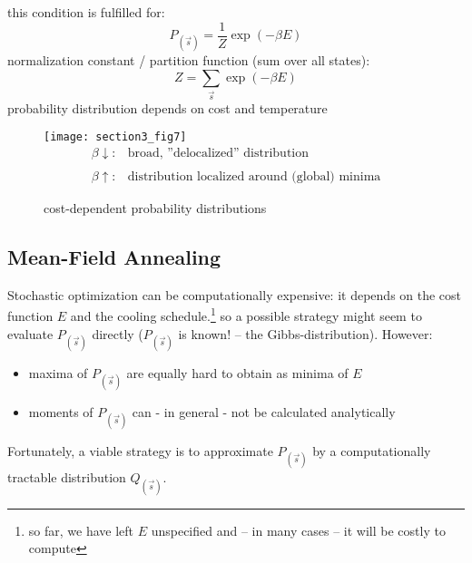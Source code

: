 this condition is fulfilled for:
\begin{equation} \tag{Gibbs-Boltzmann-distribution}
	P_{(\vec{s})} = \frac{1}{Z} \exp(-\beta E) 
\end{equation}
normalization constant / partition function (sum over all states):
\begin{equation}
	Z = \sum\limits_{\vec{s}} \exp(-\beta E)
\end{equation}
probability distribution depends on cost and temperature
\begin{figure}[h]
  \centering
\texttt{[image: section3\_fig7]}  
\[ \begin{array}{ll}
	\beta \downarrow:
	& \text{broad, ''delocalized'' distribution} \\\\
	\beta \uparrow:
	& \text{distribution localized around (global) minima}
\end{array} \]
  \caption{cost-dependent probability distributions}
  \label{fig:costProba}
\end{figure}




\newpage						%
\subsection{Mean-Field Annealing}
\label{sec:mean-field-annealing}
Stochastic optimization can be computationally expensive: it depends on the cost function $E$ and the cooling schedule.\footnote{so far, we have left $E$ unspecified and -- in many cases -- it will be costly to compute} so a possible strategy might seem to evaluate $P_{(\vec{s})}$ directly ($P_{(\vec{s})}$ is known! -- the Gibbs-distribution). However: 
\begin{itemize}
	\item maxima of $P_{(\vec{s})}$ are equally hard to obtain as minima
		of $E$
	\item moments of $P_{(\vec{s})}$ can - in general - not be calculated
		analytically
\end{itemize}
Fortunately, a viable strategy is to approximate $P_{(\vec{s})}$ by a
computationally tractable distribution $Q_{(\vec{s})}$. 

